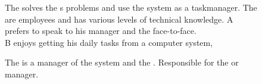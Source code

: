 \begin{figure}[h]
\begin{sadlistar}{\Astaff}
 The \astaff{} solves the \aclient[]s problems and use the system as a taskmanager.  
 The \astaff[] are employees and has various levels of technical knowledge.
 \astaff[c] A prefers to speak to his manager and the \aclient[] face-to-face.\\
\astaff[c] B enjoys getting his daily tasks from a computer system, 
 \end{sadlistar}
 \caption{}
 \label{fig:actorstaff}
 \end{figure}


\begin{figure}[h]
\begin{sadlistar}{\Admin[]}
 The \Admin[] is a manager of the system and the \astaff[].
 Responsible for the \hdesk[] or \astaff[] manager. 
 
 \end{sadlistar}
 \caption{}
 \label{fig:actoradmin}
 \end{figure}